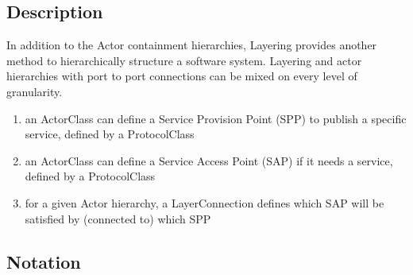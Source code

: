 \subsection{Description}

In addition to the Actor containment hierarchies, Layering provides another method to hierarchically 
structure a software system. Layering and actor hierarchies with port to port connections can be mixed on 
every level of granularity.
\begin{enumerate}
\item an ActorClass can define a Service Provision Point (SPP) to publish a specific service, defined by a 
ProtocolClass
\item an ActorClass can define a Service Access Point (SAP) if it needs a service, defined by a 
ProtocolClass
\item for a given Actor hierarchy, a LayerConnection defines which SAP will be satisfied by (connected to) 
which SPP
\end{enumerate}

\subsection{Notation}

